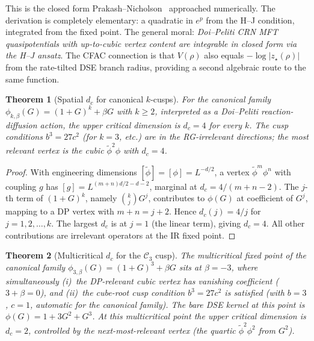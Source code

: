 \documentclass[11pt,a4paper]{article}
\theoremstyle{plain}
\newtheorem{theorem}{Theorem}
\newcommand{\Ck}{\mathcal{C}}
\begin{document}
This is the closed form Prakash--Nicholson~\citep{PrakashNicholson2024}
approached numerically.  The derivation is completely elementary: a
quadratic in $e^{p}$ from the H--J condition, integrated from the
fixed point.  The general moral: \emph{Doi--Peliti CRN MFT
quasipotentials with up-to-cubic vertex content are integrable in
closed form via the H--J ansatz}.  The CFAC connection is that
$V(\rho)$ also equals $-\log|z_{\star}(\rho)|$ from the rate-tilted
DSE branch radius, providing a second algebraic route to the same
function.

\begin{theorem}[Spatial $d_c$ for canonical $k$-cusps]\label{thm:dc}
For the canonical family $\phi_{k,\beta}(G) = (1+G)^{k} + \beta G$ with
$k\geq 2$, interpreted as a Doi--Peliti reaction-diffusion action, the
upper critical dimension is $d_{c} = 4$ for every $k$.  The cusp
conditions $b^{3} = 27 c^{2}$ (for $k = 3$, etc.) are in the
RG-irrelevant directions; the most relevant vertex is the cubic
$\tilde\phi^{2}\phi$ with $d_{c} = 4$.
\end{theorem}

\begin{proof}
With engineering dimensions $[\tilde\phi] = [\phi] = L^{-d/2}$, a vertex
$\tilde\phi^{m}\phi^{n}$ with coupling $g$ has
$[g] = L^{(m+n)d/2 - d - 2}$, marginal at
$d_{c} = 4/(m+n-2)$.  The $j$-th term of $(1+G)^{k}$, namely $\binom{k}{j}G^{j}$,
contributes to $\phi(G)$ at coefficient of $G^{j}$, mapping to a
DP vertex with $m+n = j+2$.  Hence
$d_{c}(j) = 4/j$ for $j = 1, 2, \ldots, k$.  The largest $d_{c}$ is at
$j = 1$ (the linear term), giving $d_{c} = 4$.  All other
contributions are irrelevant operators at the IR fixed point.
\end{proof}

\begin{theorem}[Multicritical $d_{c}$ for the $\Ck_{3}$ cusp]\label{thm:mc}
The multicritical fixed point of the canonical family
$\phi_{3,\beta}(G) = (1+G)^{3} + \beta G$ sits at $\beta = -3$, where
simultaneously
  \emph{(i)}\, the DP-relevant cubic vertex has vanishing coefficient
  ($3 + \beta = 0$), and
  \emph{(ii)}\, the cube-root cusp condition $b^{3} = 27 c^{2}$ is
  satisfied (with $b = 3$, $c = 1$, automatic for the canonical family).
The bare DSE kernel at this point is $\phi(G) = 1 + 3 G^{2} + G^{3}$.
At this multicritical point the upper critical dimension is
$d_{c} = 2$, controlled by the next-most-relevant vertex (the quartic
$\tilde\phi^{2}\phi^{2}$ from $G^{2}$).
\end{theorem}
\end{document}
